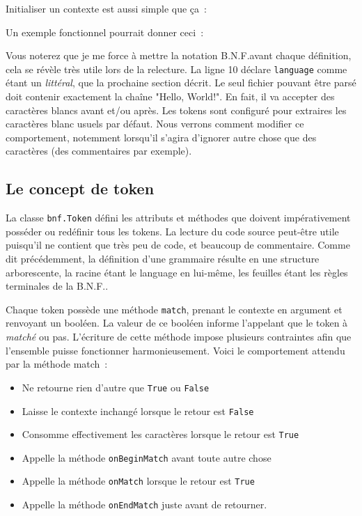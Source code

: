 \documentclass[a4paper]{article}
\newcommand{\insertpython}[1]{%
{\ttfamily}%
}
\newcommand{\fixed}[1]{\texttt{#1}}
\newcommand{\bnf}{B.N.F.}
\begin{document}
            Initialiser un contexte est aussi simple que ça~:
            \insertpython{listings/bnf/ex00.py}

            Un exemple fonctionnel pourrait donner ceci~:
            \insertpython{listings/bnf/ex01.py}

            Vous noterez que je me force à mettre la notation \bnf avant chaque
            définition, cela se révèle très utile lors de la relecture. La ligne 10
            déclare \fixed{language} comme étant un \emph{littéral}, que la
            prochaine section décrit. Le seul fichier pouvant être parsé doit
            contenir exactement la chaîne "Hello, World!". En fait, il va
            accepter des caractères blancs avant et/ou après. Les tokens sont
            configuré pour extraires les caractères blanc usuels par défaut.
            Nous verrons comment modifier ce comportement, notemment lorsqu'il
            s'agira d'ignorer autre chose que des caractères (des commentaires
            par exemple).

        \subsection{Le concept de token}
            La classe \fixed{bnf.Token} défini les attributs et méthodes que
            doivent impérativement posséder ou redéfinir tous les tokens.
            La lecture du code source peut-être utile puisqu'il ne contient
            que très peu de code, et beaucoup de commentaire.
            Comme dit précédemment, la définition
            d'une grammaire résulte en une structure arborescente, la racine
            étant le language en lui-même, les feuilles étant les règles
            terminales de la \bnf.

            Chaque token possède une méthode \fixed{match}, prenant
            le contexte en argument et renvoyant un booléen. La valeur de ce booléen
            informe l'appelant que le token à \emph{matché} ou pas. L'écriture de
            cette méthode impose plusieurs contraintes afin que l'ensemble puisse
            fonctionner harmonieusement.
            Voici le comportement attendu par la méthode match~:
            \begin{itemize}
                \item Ne retourne rien d'autre que \fixed{True} ou \fixed{False}
                \item Laisse le contexte inchangé lorsque le retour est \fixed{False}
                \item Consomme effectivement les caractères lorsque le retour est \fixed{True}
                \item Appelle la méthode \fixed{onBeginMatch} avant toute autre chose
                \item Appelle la méthode \fixed{onMatch} lorsque le retour est \fixed{True}
                \item Appelle la méthode \fixed{onEndMatch} juste avant de retourner.
            \end{itemize}
\end{document}
